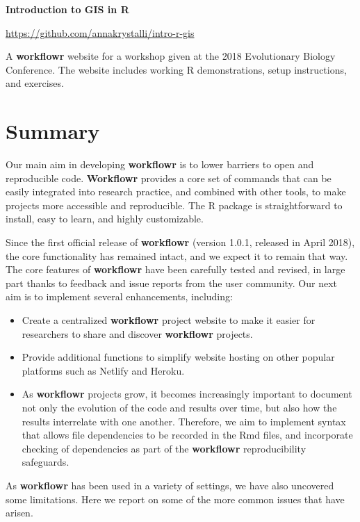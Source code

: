 \documentclass[9pt,a4paper]{extarticle}
\begin{document}
\textbf{Introduction to GIS in R}

\url{https://github.com/annakrystalli/intro-r-gis}

A \textbf{workflowr} website for a workshop given at the 2018 Evolutionary
Biology Conference. The website includes working R demonstrations, setup
instructions, and exercises.


\section*{Summary}

Our main aim in developing \textbf{workflowr} is to lower barriers to open and
reproducible code. \textbf{Workflowr} provides a core set of commands that can be
easily integrated into research practice, and combined with other tools,
to make projects more accessible and reproducible. The R package is
straightforward to install, easy to learn, and highly customizable.

Since the first official release of \textbf{workflowr} (version 1.0.1, released
in April 2018), the core functionality has remained intact, and we
expect it to remain that way. The core features of \textbf{workflowr} have been
carefully tested and revised, in large part thanks to feedback and issue
reports from the user community. Our next aim is to implement several
enhancements, including:

\begin{itemize}

\item Create a centralized \textbf{workflowr} project website to make it easier
for researchers to share and discover \textbf{workflowr} projects.

\item Provide additional functions to simplify website hosting on other
popular platforms such as Netlify and Heroku.

\item As \textbf{workflowr} projects grow, it becomes increasingly important to
document not only the evolution of the code and results over time, but
also how the results interrelate with one another. Therefore, we aim to
implement syntax that allows file dependencies to be recorded in the Rmd
files, and incorporate checking of dependencies as part of the \textbf{workflowr}
reproducibility safeguards.

\end{itemize}

As \textbf{workflowr} has been used in a variety of settings, we have also
uncovered some limitations. Here we report on some of the more common
issues that have arisen.
\end{document}
